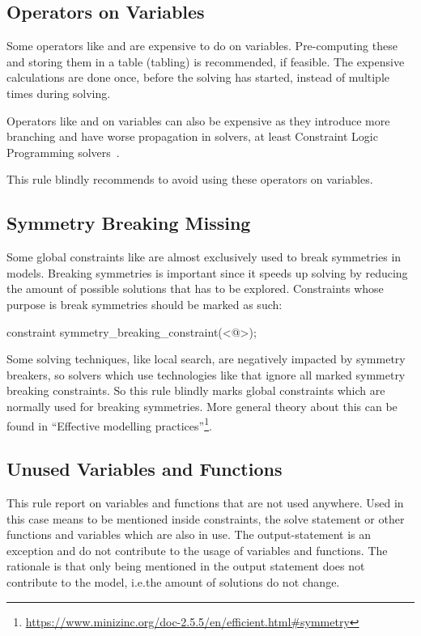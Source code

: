\documentclass[a4paper,12pt]{article}
\begin{document}
\subsection{Operators on Variables}\label{sec:rule:opvar}
Some operators like  and  are expensive to do on variables. Pre-computing
these and storing them in a table (tabling) is recommended, if feasible. The expensive
calculations are done once, before the solving has started, instead of multiple times
during solving.

Operators like \mi{\\/} and \mi{->} on variables can also be expensive as they introduce
more branching and have worse propagation in solvers, at least Constraint Logic
Programming solvers~\cite[p.~430]{constraintshandbook}.

This rule blindly recommends to avoid using these operators on variables.

\subsection{Symmetry Breaking Missing}\label{sec:rule:symbreak}
Some global constraints like  are almost exclusively used to break
symmetries in models. Breaking symmetries is important since it speeds up solving by
reducing the amount of possible solutions that has to be explored. Constraints whose
purpose is break symmetries should be marked as such:
\begin{mznnobreak}
constraint symmetry_breaking_constraint(<@\dots@>);
\end{mznnobreak}
Some solving techniques, like local search, are negatively impacted
by symmetry breakers, so solvers which use technologies like that ignore all marked
symmetry breaking constraints. So this rule blindly marks global constraints which are
normally used for breaking symmetries. More general theory about this can be found in
``Effective modelling practices''\footnote{\url{https://www.minizinc.org/doc-2.5.5/en/efficient.html\#symmetry}}.

\subsection{Unused Variables and Functions}\label{sec:rule:unused}
This rule report on variables and functions that are not used anywhere.
Used in this case means to be mentioned inside constraints, the solve statement or other
functions and variables which are also in use. The output-statement is an exception and
do not contribute to the usage of variables and functions. The rationale is that only being
mentioned in the output statement does not contribute to the model, i.e.\@ the amount of
solutions do not change.
\end{document}
